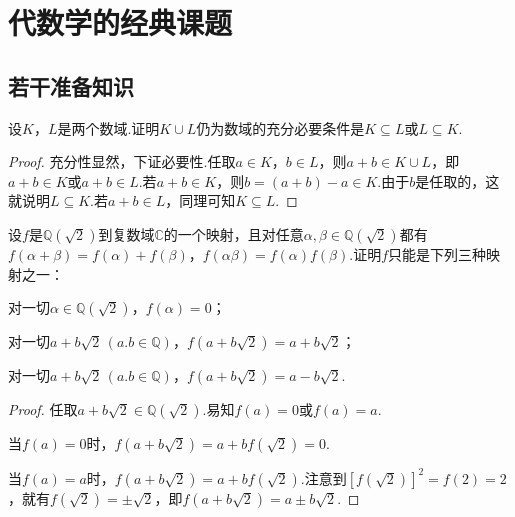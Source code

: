 \section{代数学的经典课题}
\subsection{若干准备知识}
\begin{prob}[13]
	设$K$，$L$是两个数域.证明$K\cup L$仍为数域的充分必要条件是$K\subseteq L$或$L\subseteq K$.
\end{prob}
\begin{proof}
	充分性显然，下证必要性.任取$a\in K$，$b\in L$，则$a+b\in K\cup L$，即$a+b\in K$或$a+b\in L$.若$a+b\in K$，则$b=(a+b)-a\in K$.由于$b$是任取的，这就说明$L\subseteq K$.若$a+b\in L$，同理可知$K\subseteq L$.
\end{proof}
\begin{prob}[15]
	设$f$是$\mathbb{Q}(\sqrt{2})$到复数域$\mathbb{C}$的一个映射，且对任意$\alpha,\beta\in\mathbb{Q}(\sqrt{2})$都有$f(\alpha+\beta)=f(\alpha)+f(\beta)$，$f(\alpha\beta)=f(\alpha)f(\beta)$.证明$f$只能是下列三种映射之一：
	\begin{mylist}
		\item 对一切$\alpha\in\mathbb{Q}(\sqrt{2})$，$f(\alpha)=0$；
		\item 对一切$a+b\sqrt{2}\,(a.b\in\mathbb{Q})$，$f(a+b\sqrt{2})=a+b\sqrt{2}$；
		\item 对一切$a+b\sqrt{2}\,(a.b\in\mathbb{Q})$，$f(a+b\sqrt{2})=a-b\sqrt{2}$.
	\end{mylist}
\end{prob}
\begin{proof}
	任取$a+b\sqrt{2}\in\mathbb{Q}(\sqrt{2})$.易知$f(a)=0$或$f(a)=a$.

	当$f(a)=0$时，$f(a+b\sqrt{2})=a+bf(\sqrt{2})=0$.

	当$f(a)=a$时，$f(a+b\sqrt{2})=a+bf(\sqrt{2})$.注意到$[f(\sqrt{2})]^2=f(2)=2$，就有$f(\sqrt{2})=\pm\sqrt{2}$，即$f(a+b\sqrt{2})=a\pm b\sqrt{2}$.
\end{proof}
